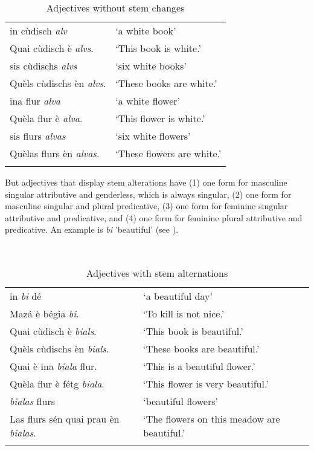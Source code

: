 {\begin{table}
\caption{Adjectives without stem changes}
\label{tab:adj:nostemchange}
 \begin{tabular}{ll} %
  \lsptoprule
  \midrule
 in cùdisch \textit{alv} & `a white book'\\
Quai cùdisch è \textit{alvs}. & `This book is white.'\\
sis cùdischs \textit{alvs} & `six white books'\\
Quèls cùdischs èn \textit{alvs}. & `These books are white.'\\
ina flur \textit{alva} & `a white flower'\\
Quèla flur è \textit{alva}. & `This flower is white.'\\
sis flurs \textit{alvas} & `six white flowers'\\
Quèlas flurs èn \textit{alvas}. & `These flowers are white.'\\
  \lspbottomrule
 \end{tabular}
\end{table}

But adjectives that display stem alterations have (1) one form for masculine singular attributive and genderless, which is always singular, (2) one form for masculine singular and plural predicative, (3) one form for feminine singular attributive and predicative, and (4) one form for feminine plural attributive and predicative. An example is \textit{bi} 'beautiful' (see ).

\begin{table}\
\caption{Adjectives with stem alternations}
\label{tab:adj:stemalternations}
 \begin{tabular}{ll} %
  \lsptoprule
   \midrule
  in \textit{bi} dé & `a beautiful day'\\
Mazá è bégia \textit{bi}. &`To kill is not nice.'\\
Quai cùdisch è \textit{bials}. & `This book is beautiful.'\\
Quèls cùdischs èn \textit{bials}. & `These books are beautiful.'\\
Quai è ina \textit{biala} flur. & `This is a beautiful flower.'\\
Quèla flur è fétg \textit{biala}. &`This flower is very beautiful.'\\
\textit{bialas} flurs & `beautiful flowers'\\
Las flurs sén quai prau èn \textit{bialas}. &`The flowers on this meadow are beautiful.'\\
  \lspbottomrule
 \end{tabular}
\end{table}

}
